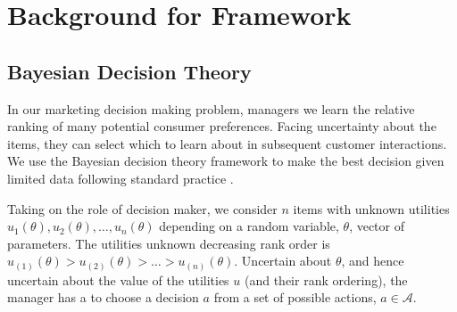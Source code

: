 \documentclass[nonblindrev]{informs3}
\newcommand{\numitems}{n}
\begin{document}










\section{Background for Framework}

\subsection{Bayesian Decision Theory}

In our marketing decision making problem, managers we learn the relative ranking of many potential consumer preferences. Facing uncertainty about the items, they can select which to learn about in subsequent customer interactions. We use the Bayesian decision theory framework to make the best decision given limited data following standard practice \citep{GelmanEtAl2004}. 

Taking on the role of decision maker, we consider $\numitems$ items with unknown utilities $u_1(\theta),u_2(\theta), \ldots, u_\numitems(\theta)$ depending on a random variable, $\theta$,  vector of parameters. The utilities unknown decreasing rank order is $u_{(1)}(\theta) > u_{(2)}(\theta) > \ldots > u_{(\numitems)}(\theta)$. Uncertain about $\theta$, and hence uncertain about the value of the utilities $u$ (and their rank ordering), the manager has a to choose a decision $a$ from a set of possible actions, $a \in \mathcal{A}$. 
\end{document}

